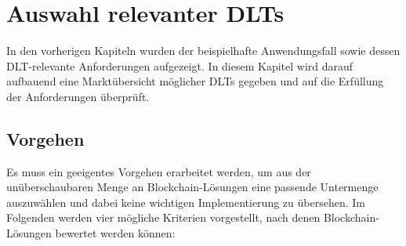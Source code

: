 \chapter{Auswahl relevanter DLTs}
\label{ch:dlt_selection}
In den vorherigen Kapiteln wurden der beispielhafte Anwendungsfall sowie dessen \ac{DLT}-relevante Anforderungen aufgezeigt. In diesem Kapitel wird darauf aufbauend eine Marktübersicht möglicher \ac{DLT}s gegeben und auf die Erfüllung der Anforderungen überprüft.

%
%
\section{Vorgehen}
\label{sec:dlt_selection:approach}
Es muss ein geeigentes Vorgehen erarbeitet werden, um aus der unüberschaubaren Menge an Blockchain-Lösungen eine passende Untermenge auszuwählen und dabei keine wichtigen Implementierung zu übersehen. Im Folgenden werden vier mögliche Kriterien vorgestellt, nach denen Blockchain-Lösungen bewertet werden können:
